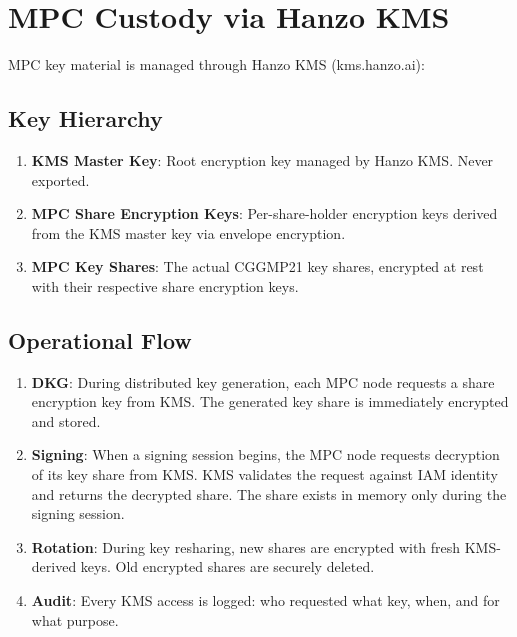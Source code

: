 \section{MPC Custody via Hanzo KMS}

\label{sec:custody}

MPC key material is managed through Hanzo KMS (kms.hanzo.ai):

\subsection{Key Hierarchy}

\begin{enumerate}[leftmargin=1.4em]
    \item \textbf{KMS Master Key}: Root encryption key managed by Hanzo
    KMS. Never exported.
    \item \textbf{MPC Share Encryption Keys}: Per-share-holder encryption
    keys derived from the KMS master key via envelope encryption.
    \item \textbf{MPC Key Shares}: The actual CGGMP21 key shares,
    encrypted at rest with their respective share encryption keys.
\end{enumerate}

\subsection{Operational Flow}

\begin{enumerate}[leftmargin=1.4em]
    \item \textbf{DKG}: During distributed key generation, each MPC
    node requests a share encryption key from KMS. The generated key
    share is immediately encrypted and stored.
    \item \textbf{Signing}: When a signing session begins, the MPC node
    requests decryption of its key share from KMS. KMS validates the
    request against IAM identity and returns the decrypted share. The
    share exists in memory only during the signing session.
    \item \textbf{Rotation}: During key resharing, new shares are
    encrypted with fresh KMS-derived keys. Old encrypted shares are
    securely deleted.
    \item \textbf{Audit}: Every KMS access is logged: who requested
    what key, when, and for what purpose.
\end{enumerate}

